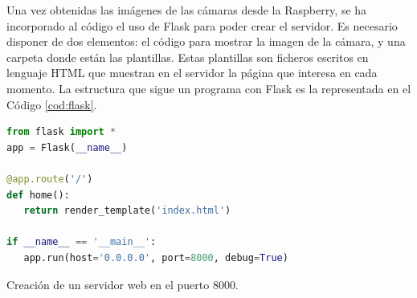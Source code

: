 Una vez obtenidas las imágenes de las cámaras desde la Raspberry, se ha incorporado al código el uso de Flask para poder crear el servidor. Es necesario disponer de dos elementos: el código para mostrar la imagen de la cámara, y una carpeta donde están las plantillas. Estas plantillas son ficheros escritos en lenguaje HTML que muestran en el servidor la página que interesa en cada momento. La estructura que sigue un programa con Flask es la representada en el Código \ref{cod:flask}.\\
\begin{code}[h]
\begin{lstlisting}[language=Python]
from flask import *
app = Flask(__name__)

@app.route('/')
def home():
   return render_template('index.html')

if __name__ == '__main__':
   app.run(host='0.0.0.0', port=8000, debug=True)
\end{lstlisting}
\caption[Creación de un servidor web en el puerto 8000.]{Creación de un servidor web en el puerto 8000.}
\label{cod:flask}
\end{code}


